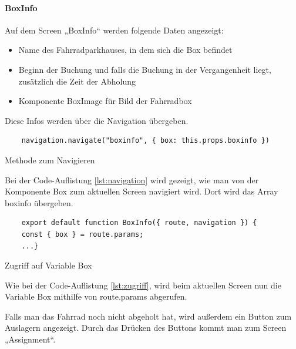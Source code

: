 \bigskip


\paragraph{BoxInfo}
Auf dem Screen „BoxInfo“ werden folgende Daten angezeigt:

\begin{itemize}
  \item Name des Fahrradparkhauses, in dem sich die Box befindet
  \item Beginn der Buchung und falls die Buchung in der Vergangenheit liegt, zusätzlich die Zeit der Abholung
  \item Komponente BoxImage für Bild der Fahrradbox
\end{itemize}

Diese Infos werden über die Navigation übergeben.

\begin{listing}[H]
  \begin{verbatim}
    navigation.navigate("boxinfo", { box: this.props.boxinfo })
\end{verbatim}
  \caption{Methode zum Navigieren}
  \label{lst:navigation}
\end{listing}

Bei der Code-Auflistung \ref{lst:navigation} wird gezeigt, wie man von der Komponente Box zum aktuellen Screen navigiert wird. Dort wird das \Gls{Array} boxinfo übergeben.

\begin{listing}[H]
  \begin{verbatim}
    export default function BoxInfo({ route, navigation }) {
    const { box } = route.params;
    ...}
\end{verbatim}
  \caption{Zugriff auf Variable Box}
  \label{lst:zugriff}
\end{listing}


Wie bei der Code-Auflistung \ref{lst:zugriff}, wird beim aktuellen Screen nun die Variable Box mithilfe von route.params abgerufen.

\noindent Falls man das Fahrrad noch nicht abgeholt hat, wird außerdem ein Button zum Auslagern angezeigt. Durch das Drücken des Buttons kommt man zum Screen „Assignment“.

